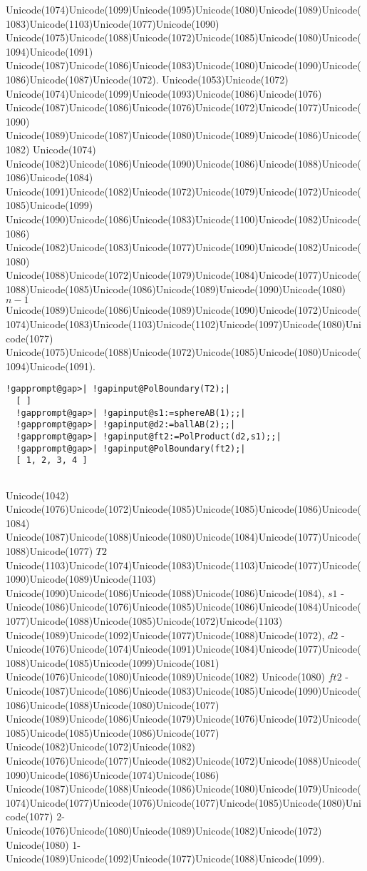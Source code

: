 \documentclass[a4paper,11pt]{report}
\begin{document}
{{{ Unicode(1074)Unicode(1099)Unicode(1095)Unicode(1080)Unicode(1089)Unicode(1083)Unicode(1103)Unicode(1077)Unicode(1090)
Unicode(1075)Unicode(1088)Unicode(1072)Unicode(1085)Unicode(1080)Unicode(1094)Unicode(1091)
Unicode(1087)Unicode(1086)Unicode(1083)Unicode(1080)Unicode(1090)Unicode(1086)Unicode(1087)Unicode(1072).
Unicode(1053)Unicode(1072)
Unicode(1074)Unicode(1099)Unicode(1093)Unicode(1086)Unicode(1076)
Unicode(1087)Unicode(1086)Unicode(1076)Unicode(1072)Unicode(1077)Unicode(1090)
Unicode(1089)Unicode(1087)Unicode(1080)Unicode(1089)Unicode(1086)Unicode(1082)
Unicode(1074)
Unicode(1082)Unicode(1086)Unicode(1090)Unicode(1086)Unicode(1088)Unicode(1086)Unicode(1084)
Unicode(1091)Unicode(1082)Unicode(1072)Unicode(1079)Unicode(1072)Unicode(1085)Unicode(1099)
Unicode(1090)Unicode(1086)Unicode(1083)Unicode(1100)Unicode(1082)Unicode(1086)
Unicode(1082)Unicode(1083)Unicode(1077)Unicode(1090)Unicode(1082)Unicode(1080)
Unicode(1088)Unicode(1072)Unicode(1079)Unicode(1084)Unicode(1077)Unicode(1088)Unicode(1085)Unicode(1086)Unicode(1089)Unicode(1090)Unicode(1080) $n-1$ Unicode(1089)Unicode(1086)Unicode(1089)Unicode(1090)Unicode(1072)Unicode(1074)Unicode(1083)Unicode(1103)Unicode(1102)Unicode(1097)Unicode(1080)Unicode(1077)
Unicode(1075)Unicode(1088)Unicode(1072)Unicode(1085)Unicode(1080)Unicode(1094)Unicode(1091). 
\begin{Verbatim}[commandchars=!@|,fontsize=\small,frame=single,label=Пример]
  !gapprompt@gap>| !gapinput@PolBoundary(T2);|
  [ ]
  !gapprompt@gap>| !gapinput@s1:=sphereAB(1);;|
  !gapprompt@gap>| !gapinput@d2:=ballAB(2);;|
  !gapprompt@gap>| !gapinput@ft2:=PolProduct(d2,s1);;|
  !gapprompt@gap>| !gapinput@PolBoundary(ft2);|
  [ 1, 2, 3, 4 ]
  						
\end{Verbatim}
 Unicode(1042)
Unicode(1076)Unicode(1072)Unicode(1085)Unicode(1085)Unicode(1086)Unicode(1084)
Unicode(1087)Unicode(1088)Unicode(1080)Unicode(1084)Unicode(1077)Unicode(1088)Unicode(1077) $T2$ Unicode(1103)Unicode(1074)Unicode(1083)Unicode(1103)Unicode(1077)Unicode(1090)Unicode(1089)Unicode(1103)
Unicode(1090)Unicode(1086)Unicode(1088)Unicode(1086)Unicode(1084), $s1$ -
Unicode(1086)Unicode(1076)Unicode(1085)Unicode(1086)Unicode(1084)Unicode(1077)Unicode(1088)Unicode(1085)Unicode(1072)Unicode(1103)
Unicode(1089)Unicode(1092)Unicode(1077)Unicode(1088)Unicode(1072), $d2$ -
Unicode(1076)Unicode(1074)Unicode(1091)Unicode(1084)Unicode(1077)Unicode(1088)Unicode(1085)Unicode(1099)Unicode(1081)
Unicode(1076)Unicode(1080)Unicode(1089)Unicode(1082) Unicode(1080) $ft2$ -
Unicode(1087)Unicode(1086)Unicode(1083)Unicode(1085)Unicode(1090)Unicode(1086)Unicode(1088)Unicode(1080)Unicode(1077)
Unicode(1089)Unicode(1086)Unicode(1079)Unicode(1076)Unicode(1072)Unicode(1085)Unicode(1085)Unicode(1086)Unicode(1077)
Unicode(1082)Unicode(1072)Unicode(1082)
Unicode(1076)Unicode(1077)Unicode(1082)Unicode(1072)Unicode(1088)Unicode(1090)Unicode(1086)Unicode(1074)Unicode(1086)
Unicode(1087)Unicode(1088)Unicode(1086)Unicode(1080)Unicode(1079)Unicode(1074)Unicode(1077)Unicode(1076)Unicode(1077)Unicode(1085)Unicode(1080)Unicode(1077)
2-Unicode(1076)Unicode(1080)Unicode(1089)Unicode(1082)Unicode(1072)
Unicode(1080)
1-Unicode(1089)Unicode(1092)Unicode(1077)Unicode(1088)Unicode(1099). }

}}
\end{document}
